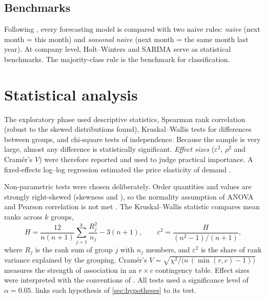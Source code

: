 \subsection{Benchmarks}
Following \citet{makridakis2018}, every forecasting model is compared with two naive rules: \emph{naive}
(next month = this month) and \emph{seasonal naive} (next month = the same month last year). At company level,
Holt--Winters and SARIMA serve as statistical benchmarks. The majority-class rule is the benchmark for
classification.

\section{Statistical analysis}
The exploratory phase used descriptive statistics, Spearman rank correlation (robust to the skewed
distributions found), Kruskal--Wallis tests for differences between groups, and chi-square tests of
independence. Because the sample is very large, almost any difference is statistically significant.
\emph{Effect sizes} ($\varepsilon^2$, $\rho^2$ and Cram\'er's $V$) were therefore reported and used to judge
practical importance. A fixed-effects log--log regression estimated the price elasticity of demand
\citep{wooldridge2020}.

Non-parametric tests were chosen deliberately. Order quantities and values are strongly right-skewed (skewness
\QtySkew and \ValueSkew), so the normality assumption of ANOVA and Pearson correlation is not met
\citep{field2018}. The Kruskal--Wallis statistic compares mean ranks across $k$ groups,
\[
  H = \frac{12}{n(n+1)} \sum_{j=1}^{k} \frac{R_j^2}{n_j} - 3(n+1),
  \qquad
  \varepsilon^2 = \frac{H}{(n^2-1)/(n+1)},
\]
where $R_j$ is the rank sum of group $j$ with $n_j$ members, and $\varepsilon^2$ is the share of rank variance
explained by the grouping. Cram\'er's $V=\sqrt{\chi^2/\bigl(n\,(\min(r,c)-1)\bigr)}$ measures the strength of
association in an $r\times c$ contingency table. Effect sizes were interpreted with the conventions of
\citet{cohen1988}. All tests used a significance level of $\alpha = 0.05$.  links each
hypothesis of \cref{sec:hypotheses} to its test.

